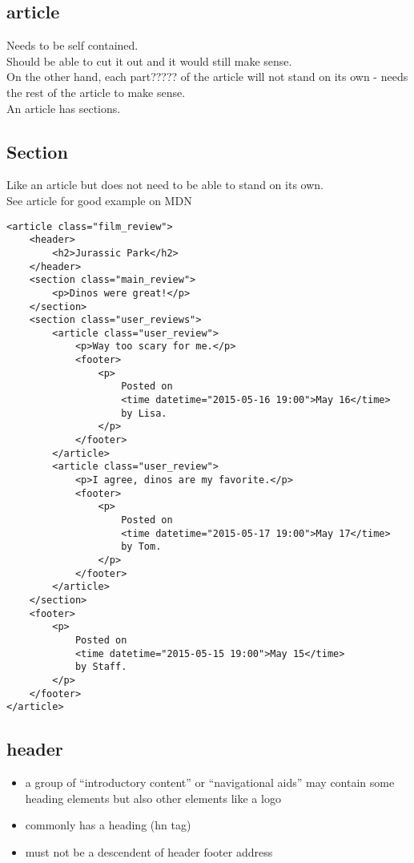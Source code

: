 \documentclass[]{article}
\newcommand{\<}{\guilsinglleft}
\renewcommand{\>}{\guilsinglright}
\begin{document}
\subsection{article}
Needs to be self contained.  
\\
Should be able to cut it out and it would still make sense.
\\
On the other hand, each part????? of the article will not stand on its own - needs the rest of the article to make sense.
\\
An article has sections.

\subsection{Section}
Like an article but does not need to be able to stand on its own.
\\
See article for good example on MDN
\begin{lstlisting}
<article class="film_review">
	<header>
		<h2>Jurassic Park</h2>
	</header>
	<section class="main_review">
		<p>Dinos were great!</p>
	</section>
	<section class="user_reviews">
		<article class="user_review">
			<p>Way too scary for me.</p>
			<footer>
				<p>
					Posted on
					<time datetime="2015-05-16 19:00">May 16</time>
					by Lisa.
				</p>
			</footer>
		</article>
		<article class="user_review">
			<p>I agree, dinos are my favorite.</p>
			<footer>
				<p>
					Posted on
					<time datetime="2015-05-17 19:00">May 17</time>
					by Tom.
				</p>
			</footer>
		</article>
	</section>
	<footer>
		<p>
			Posted on
			<time datetime="2015-05-15 19:00">May 15</time>
			by Staff.
		</p>
	</footer>
</article>
\end{lstlisting}

\subsection{header}
\begin{itemize}
	\item a group of “introductory content” or “navigational aids”
	\subitem may contain some heading elements but also other elements like a logo
	
	\item commonly has a heading (hn tag)
	
	\item must not be a descendent of 
	\subitem header
	\subitem footer
	\subitem address
\end{itemize}
\end{document}
